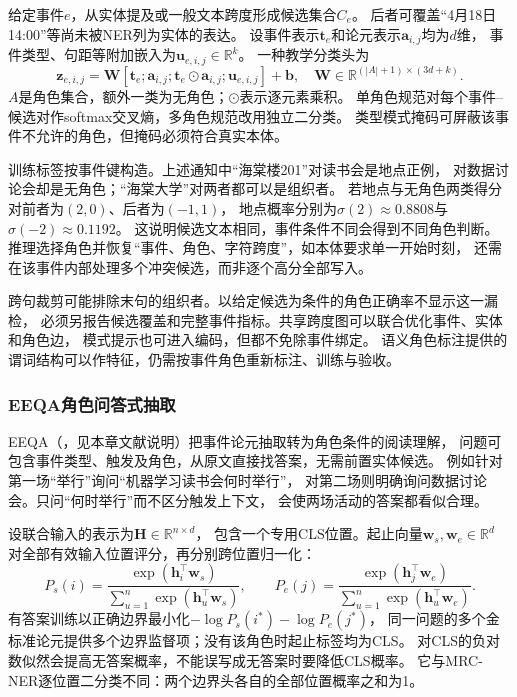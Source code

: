 给定事件$e$，从实体提及或一般文本跨度形成候选集合$C_e$。
后者可覆盖“4月18日14:00”等尚未被NER列为实体的表达。
设事件表示$\bm{t}_e$和论元表示$\bm{a}_{i,j}$均为$d$维，
事件类型、句距等附加嵌入为$\bm{u}_{e,i,j}\in\mathbb{R}^{k}$。
一种教学分类头为
\begin{equation}
  \bm{z}_{e,i,j}
  =\bm{W}[\bm{t}_e;\bm{a}_{i,j};
             \bm{t}_e\odot\bm{a}_{i,j};\bm{u}_{e,i,j}]+\bm{b},
  \quad \bm{W}\in\mathbb{R}^{(|A|+1)\times(3d+k)}.
  \label{eq:nlp-extraction-argument-spans}
\end{equation}
$A$是角色集合，额外一类为无角色；$\odot$表示逐元素乘积。
单角色规范对每个事件--候选对作softmax交叉熵，多角色规范改用独立二分类。
类型模式掩码可屏蔽该事件不允许的角色，但掩码必须符合真实本体。

训练标签按事件键构造。上述通知中“海棠楼201”对读书会是地点正例，
对数据讨论会却是无角色；“海棠大学”对两者都可以是组织者。
若地点与无角色两类得分对前者为$(2,0)$、后者为$(-1,1)$，
地点概率分别为$\sigma(2)\approx0.8808$与$\sigma(-2)\approx0.1192$。
这说明候选文本相同，事件条件不同会得到不同角色判断。
推理选择角色并恢复“事件、角色、字符跨度”，如本体要求单一开始时刻，
还需在该事件内部处理多个冲突候选，而非逐个高分全部写入。

跨句裁剪可能排除末句的组织者。以给定候选为条件的角色正确率不显示这一漏检，
必须另报告候选覆盖和完整事件指标。共享跨度图可以联合优化事件、实体和角色边，
模式提示也可进入编码，但都不免除事件绑定。
语义角色标注提供的谓词结构可以作特征，仍需按事件角色重新标注、训练与验收。

\subsubsection{EEQA角色问答式抽取}
\label{sec:nlp-extraction-eeqa}

EEQA（\citeyear{du2020eeqa}，见本章文献说明）把事件论元抽取转为角色条件的阅读理解，
问题可包含事件类型、触发及角色，从原文直接找答案，无需前置实体候选。
例如针对第一场“举行”询问“机器学习读书会何时举行”，
对第二场则明确询问数据讨论会。只问“何时举行”而不区分触发上下文，
会使两场活动的答案都看似合理。

设联合输入的表示为$\bm{H}\in\mathbb{R}^{n\times d}$，
包含一个专用CLS位置。起止向量$\bm{w}_s,\bm{w}_e\in\mathbb{R}^{d}$
对全部有效输入位置评分，再分别跨位置归一化：
\begin{equation}
  P_s(i)=\frac{\exp(\bm{h}_i^\top\bm{w}_s)}
               {\sum_{u=1}^{n}\exp(\bm{h}_u^\top\bm{w}_s)},
  \qquad
  P_e(j)=\frac{\exp(\bm{h}_j^\top\bm{w}_e)}
               {\sum_{u=1}^{n}\exp(\bm{h}_u^\top\bm{w}_e)}.
  \label{eq:nlp-extraction-eeqa}
\end{equation}
有答案训练以正确边界最小化$-\log P_s(i^*)-\log P_e(j^*)$，
同一问题的多个金标准论元提供多个边界监督项；没有该角色时起止标签均为CLS。
对CLS的负对数似然会提高无答案概率，不能误写成无答案时要降低CLS概率。
它与MRC-NER逐位置二分类不同：两个边界头各自的全部位置概率之和为1。

